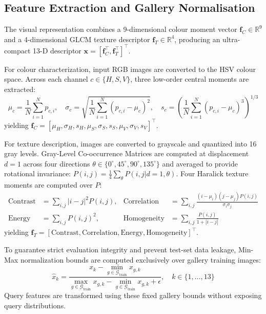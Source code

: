 \documentclass[pdflatex,sn-mathphys-num]{sn-jnl}
\begin{document}
\subsection{Feature Extraction and Gallery Normalisation}\label{subsec3.1}
The visual representation combines a 9-dimensional colour moment vector $\mathbf{f}_C \in \mathbb{R}^9$ and a 4-dimensional GLCM texture descriptor $\mathbf{f}_T \in \mathbb{R}^4$, producing an ultra-compact 13-D descriptor $\mathbf{x} = [\mathbf{f}_C^\top, \mathbf{f}_T^\top]^\top$.

For colour characterization, input RGB images are converted to the HSV colour space. Across each channel $c \in \{H, S, V\}$, three low-order central moments are extracted:
\begin{equation}
\mu_c = \frac{1}{N}\sum_{i=1}^{N} p_{c,i}, \quad \sigma_c = \sqrt{\frac{1}{N}\sum_{i=1}^{N}(p_{c,i}-\mu_c)^2}, \quad s_c = \left(\frac{1}{N}\sum_{i=1}^{N}(p_{c,i}-\mu_c)^3\right)^{1/3}
\end{equation}
yielding $\mathbf{f}_C = [\mu_H, \sigma_H, s_H, \mu_S, \sigma_S, s_S, \mu_V, \sigma_V, s_V]^\top$.

For texture description, images are converted to grayscale and quantized into 16 gray levels. Gray-Level Co-occurrence Matrices are computed at displacement $d=1$ across four directions $\theta \in \{0^\circ, 45^\circ, 90^\circ, 135^\circ\}$ and averaged to provide rotational invariance: $P(i,j) = \frac{1}{4}\sum_\theta P(i,j | d=1, \theta)$. Four Haralick texture moments are computed over $P$:
\begin{align}
\text{Contrast} &= \sum_{i,j}|i-j|^2 P(i,j), & \text{Correlation} &= \sum_{i,j}\frac{(i-\mu_i)(j-\mu_j)P(i,j)}{\sigma_i \sigma_j} \\
\text{Energy} &= \sum_{i,j} P(i,j)^2, & \text{Homogeneity} &= \sum_{i,j}\frac{P(i,j)}{1+|i-j|}
\end{align}
yielding $\mathbf{f}_T = [\text{Contrast}, \text{Correlation}, \text{Energy}, \text{Homogeneity}]^\top$.

To guarantee strict evaluation integrity and prevent test-set data leakage, Min-Max normalization bounds are computed exclusively over gallery training images:
\begin{equation}
\hat{x}_k = \frac{x_k - \min_{g \in \mathcal{G}_{\text{train}}} x_{g,k}}{\max_{g \in \mathcal{G}_{\text{train}}} x_{g,k} - \min_{g \in \mathcal{G}_{\text{train}}} x_{g,k} + \epsilon}, \quad k \in \{1,\dots,13\}
\end{equation}
Query features are transformed using these fixed gallery bounds without exposing query distributions.
\end{document}
